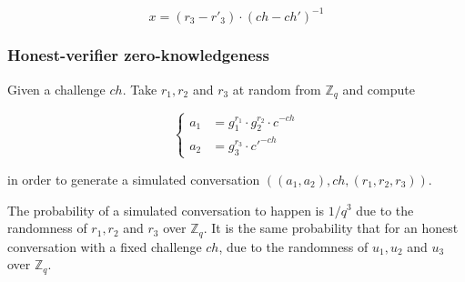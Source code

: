 \documentclass{article}
\begin{document}
$$x = (r_3 - r'_3) \cdot (ch - ch')^{-1}$$

\subsubsection{Honest-verifier zero-knowledgeness}

Given a challenge $ch$. Take $r_1, r_2$ and $r_3$ at random from $\mathbb{Z}_q$ 
and compute

$$
\begin{cases}
  a_1 &= g_1^{r_1} \cdot g_2^{r_2} \cdot c^{-ch} \\
  a_2 &= g_3^{r_3} \cdot c'^{-ch}
\end{cases}
$$

in order to generate a simulated conversation $((a_1, a_2), ch, (r_1, r_2, r_3))$.

The probability of a simulated conversation to happen 
is $1/q^3$ due to the randomness of $r_1, r_2$ and $r_3$ over $\mathbb{Z}_q$.
It is the same probability that for an honest conversation with 
a fixed challenge $ch$, due to the randomness of $u_1, u_2$ and $u_3$ 
over $\mathbb{Z}_q$.
\end{document}
